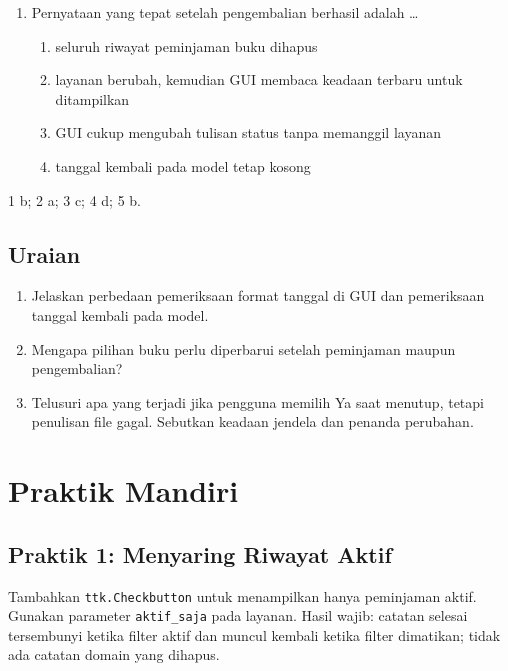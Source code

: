 \begin{enumerate}
\begin{enumerate}[label=\alph*.,itemsep=0pt]
  \end{enumerate}
  \item Pernyataan yang tepat setelah pengembalian berhasil adalah \ldots
  \begin{enumerate}[label=\alph*.,itemsep=0pt]
    \item seluruh riwayat peminjaman buku dihapus
    \item layanan berubah, kemudian GUI membaca keadaan terbaru untuk ditampilkan
    \item GUI cukup mengubah tulisan status tanpa memanggil layanan
    \item tanggal kembali pada model tetap kosong
  \end{enumerate}
\end{enumerate}

\begin{info}
1 b; 2 a; 3 c; 4 d; 5 b.
\end{info}

\subsection{Uraian}

\begin{enumerate}
  \item Jelaskan perbedaan pemeriksaan format tanggal di GUI dan pemeriksaan tanggal kembali pada model.
  \item Mengapa pilihan buku perlu diperbarui setelah peminjaman maupun pengembalian?
  \item Telusuri apa yang terjadi jika pengguna memilih Ya saat menutup, tetapi penulisan file gagal. Sebutkan keadaan jendela dan penanda perubahan.
\end{enumerate}

\section{Praktik Mandiri}

\subsection{Praktik 1: Menyaring Riwayat Aktif}

Tambahkan \texttt{ttk.Checkbutton} untuk menampilkan hanya peminjaman aktif. Gunakan parameter \texttt{aktif\_saja} pada layanan. Hasil wajib: catatan selesai tersembunyi ketika filter aktif dan muncul kembali ketika filter dimatikan; tidak ada catatan domain yang dihapus.

